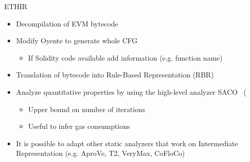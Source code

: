 \begin{frame}{ETHIR~\cite{bib:ETHIR}}
\begin{itemize}
\item Decompilation of EVM bytecode
\item Modify Oyente to generate whole CFG
\begin{itemize}
\item If Solidity code available add information (e.g. function name)
\end{itemize}
\item Translation of bytecode into Rule-Based Representation (RBR)
\item Analyze quantitative properties by using the high-level analyzer SACO~\cite{bib:SACO} (
\begin{itemize}
\item Upper bound on number of iterations
\item Useful to infer gas consumptions
\end{itemize}
\item It is possible to adapt other static analyzers that work on Intermediate Representation (e.g. AproVe, T2, VeryMax, CoFloCo)
\end{itemize}

\end{frame}